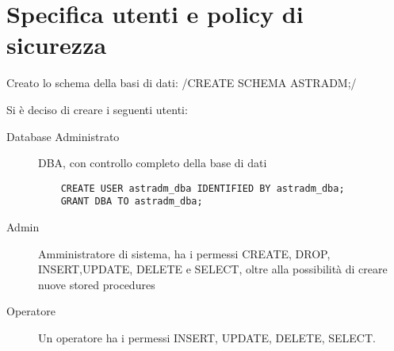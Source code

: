 \section{Specifica utenti e policy di sicurezza}
Creato lo schema della basi di dati:
/CREATE SCHEMA ASTRADM;/
\par
Si è deciso di creare i seguenti utenti:
\begin{description}
\item[Database Administrato] DBA, con controllo completo della base di dati
  \begin{verbatim}
    CREATE USER astradm_dba IDENTIFIED BY astradm_dba;
    GRANT DBA TO astradm_dba;
  \end{verbatim}
\item[Admin] Amministratore di sistema, ha i permessi CREATE, DROP, INSERT,UPDATE, DELETE e SELECT, oltre alla
  possibilità di creare nuove stored procedures
\item[Operatore] Un operatore ha i permessi INSERT, UPDATE, DELETE, SELECT.
\end{description}
